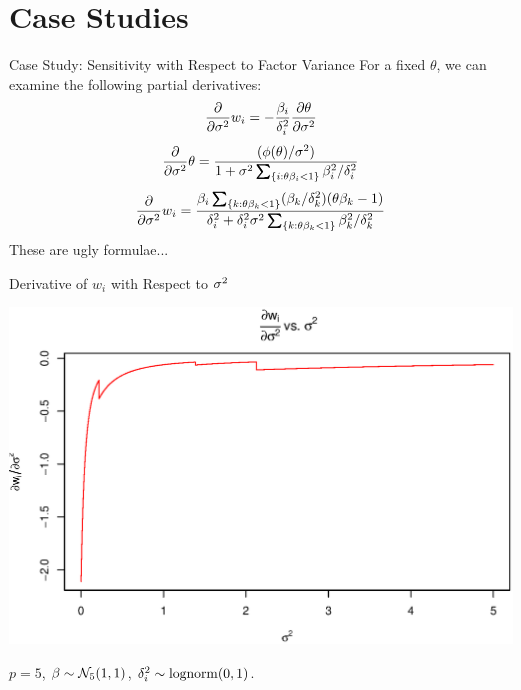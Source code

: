 \documentclass[11pt,leqno]{beamer}
\begin{document}
\section{Case Studies}
\begin{frame}{Case Study: Sensitivity with Respect to Factor Variance}
For a fixed $\theta$, we can examine the following partial derivatives:
\begin{equation}
\frac{\partial }{ \partial {\sigma^2}} w_i  = -\frac{\beta_i}{\delta_i^2}\frac{\partial \theta}{\partial \sigma^2}
\end{equation}
\begin{equation}
\diff {\gs^2} \theta  = \frac{(\phi(\theta)/\gs^2)}{1 + \gs^2 \sum_{\{i:\theta \gb_i <1 \}} \gb_i^2/\gd_i^2}
\end{equation}
\begin{equation}
\diff {\gs^2} w_i  = \frac{\gb_i \sum_{\{k: \theta \gb_k<1\}} (\gb_k/\gd_k^2)(\theta \gb_k-1)}{\gd_i^2 + \gd_i^2 \gs^2 \sum_{\{k:\theta \gb_k <1 \}} \gb_k^2/\gd_k^2}
\end{equation}
These are ugly formulae...
\end{frame}

\begin{frame}{Derivative of $w_i$ with Respect to $\sigma^2$}
\begin{centering}
\includegraphics[scale=.5]{sigma_deriva.eps}
\end{centering}
$p=5$, $\beta \sim \mathcal{N}_5(1,1)$, $\delta_i^2\sim \mathrm{lognorm}(0,1)$.
\end{frame}
\end{document}
